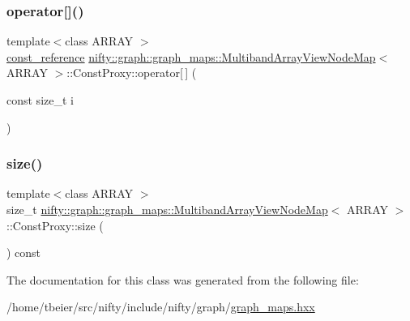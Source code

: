 \mbox{\label{classnifty_1_1graph_1_1graph__maps_1_1MultibandArrayViewNodeMap_1_1ConstProxy_aaca8a39e292ca5e0e98fe8a49dc3d0fc}} 
\subsubsection{\texorpdfstring{operator[]()}{operator[]()}\hspace{0.1cm}{\footnotesize\ttfamily [2/2]}}
{\footnotesize\ttfamily template$<$class A\+R\+R\+AY $>$ \\
\hyperlink{structnifty_1_1graph_1_1graph__maps_1_1MultibandArrayViewNodeMap_a9a4da5d4bb0e9439af359184b91bc65b}{const\+\_\+reference} \hyperlink{structnifty_1_1graph_1_1graph__maps_1_1MultibandArrayViewNodeMap}{nifty\+::graph\+::graph\+\_\+maps\+::\+Multiband\+Array\+View\+Node\+Map}$<$ A\+R\+R\+AY $>$\+::Const\+Proxy\+::operator\mbox{[}$\,$\mbox{]} (\begin{DoxyParamCaption}\item[{const size\+\_\+t}]{i }\end{DoxyParamCaption})\hspace{0.3cm}{\ttfamily [inline]}}

\mbox{\label{classnifty_1_1graph_1_1graph__maps_1_1MultibandArrayViewNodeMap_1_1ConstProxy_ad91f66c3c0b13b0528a6c99bb1663e5a}} 
\subsubsection{\texorpdfstring{size()}{size()}}
{\footnotesize\ttfamily template$<$class A\+R\+R\+AY $>$ \\
size\+\_\+t \hyperlink{structnifty_1_1graph_1_1graph__maps_1_1MultibandArrayViewNodeMap}{nifty\+::graph\+::graph\+\_\+maps\+::\+Multiband\+Array\+View\+Node\+Map}$<$ A\+R\+R\+AY $>$\+::Const\+Proxy\+::size (\begin{DoxyParamCaption}{ }\end{DoxyParamCaption}) const\hspace{0.3cm}{\ttfamily [inline]}}



The documentation for this class was generated from the following file\+:\begin{DoxyCompactItemize}
\item 
/home/tbeier/src/nifty/include/nifty/graph/\hyperlink{graph__maps_8hxx}{graph\+\_\+maps.\+hxx}\end{DoxyCompactItemize}
